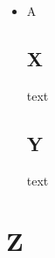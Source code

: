 \documentclass{article}
\begin{document}
\begin{itemize}
\item A \subsection{X} text \subsection{Y} text
\end{itemize}
\section{Z}
\end{document}
